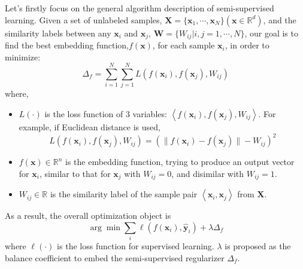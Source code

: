 \documentclass[3p,times,procedia]{elsarticle}
\begin{document}
Let's firstly focus on the 
general algorithm
description of semi-supervised learning.
Given a set of unlabeled samples,
$\mathbf{X}=\{\mathbf{x}_1,\cdots,
\mathbf{x}_N\}(\mathbf{x}\in\mathbb{R}^d)$,
and the similarity labels between any
$\mathbf{x}_i$ and $\mathbf{x}_j$,
$\mathbf{W}=\{W_{ij}|i,j=1,\cdots,N\}$,
our goal is to find the best 
embedding function,$f(\mathbf{x})$, 
for each sample $\mathbf{x}_i$, 
in order to minimize:
\begin{equation}
\Delta_{f}=
	\sum^{N}_{i=1}
	\sum^{N}_{j=1}
	L\left(
	f(\mathbf{x}_i),
	f(\mathbf{x}_j),
	W_{ij}
	\right)
\label{eq:1}
\end{equation}
where,
\begin{itemize}[]
\item $L(\cdot)$ is the loss 
function of 3 
variables: 
$\left<
		f(\mathbf{x}_i),
		f(\mathbf{x}_j),
		W_{ij}
		\right>$.
For example, if Euclidean distance
is used,
		$$L\left(
		f(\mathbf{x}_i),
		f(\mathbf{x}_j),
		W_{ij}
		\right) = 
		\left(
		\|f(\mathbf{x}_i)-
		f(\mathbf{x}_j)
		\|-W_{ij}
		\right)^2$$
\item $f(\mathbf{x})\in\mathbb{R}^n$ 
is the 
embedding function, 
trying to produce an output
vector for $\mathbf{x}_i$, 
similar to that 
for $\mathbf{x}_j$ with $W_{ij}=0$,
and disimilar with $W_{ij}=1$.
\item $W_{ij}\in \mathbb{R}$ is 
the similarity 
label of the sample pair
$\left<
		\mathbf{x}_i,
		\mathbf{x}_j
		\right>$ from $\mathbf{X}$.
\end{itemize}
As a result, the overall optimization 
object is
\begin{equation}
	\arg \min 
	\sum_i
	\ell\left(
	f(\mathbf{x}_i),
	\mathbf{\hat{y}}_i
	\right)+
	\lambda\Delta_f
\end{equation}
where $\ell(\cdot)$ is the loss
function for supervised learning.
$\lambda$ is proposed 
as the balance 
coefficient to embed
the semi-supervised 
regularizer $\Delta_f$.
\end{document}
